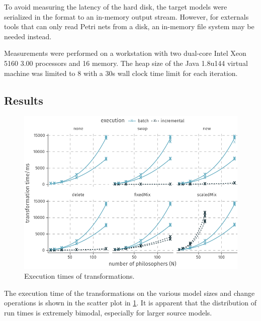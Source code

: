 To avoid measuring the latency of the hard disk, the target  models were serialized in the  format to an in-memory output stream. However, for externals tools that can only read Petri nets from a disk, an in-memory file system may be needed instead.

Measurements were performed on a workstation with two dual-core Intel Xeon 5160 3.00\thinspace {} processors and 16\thinspace {} memory. The heap size of the Java 1.8u144 virtual machine was limited to 8\thinspace {} with a 30\thinspace s wall clock time limit for each iteration.

\subsection{Results}

\begin{figure}
  \centering
  \includegraphics{figures/plot_execution}
  \caption{Execution times of transformations.}
  \label{fig:apply:plot-execution}
\end{figure}

The execution time of the transformations on the various model sizes and change operations is shown in the scatter plot in \cref{fig:apply:plot-execution}. It is apparent that the distribution of run times is extremely bimodal, especially for larger source models.

